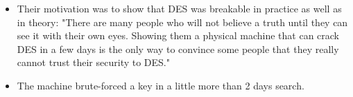 \documentclass{article}
\begin{document}

\begin{itemize}
  \item Their motivation was to show that DES was breakable in practice as well as in theory: "There are many people who will not believe a truth until they can see it with their own eyes. Showing them a physical machine that can crack DES in a few days is the only way to convince some people that they really cannot trust their security to DES."
  \item The machine brute-forced a key in a little more than 2 days search.
\end{itemize}
\end{document}
